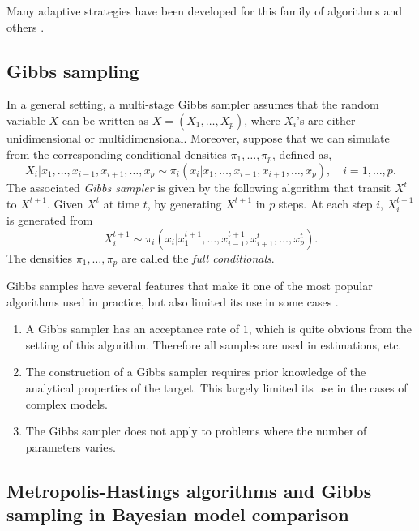 Many adaptive strategies have been developed for this family of algorithms and
others \parencite[see][for a recent review]{Andrieu:2008kh}.

\subsection{Gibbs sampling}
\label{sub:Gibbs sampling}

In a general setting, a multi-stage Gibbs sampler assumes that the random
variable $X$ can be written as $X = (X_1,\dots,X_p)$, where $X_i$'s are either
unidimensional or multidimensional. Moreover, suppose that we can simulate
from the corresponding conditional densities $\pi_1,\dots,\pi_p$, defined as,
\begin{equation}
  X_i|x_1,\dots,x_{i-1},x_{i+1},\dots,x_p
  \sim \pi_i(x_i|x_1,\dots,x_{i-1},x_{i+1},\dots,x_p),\quad i = 1,\dots,p.
\end{equation}
The associated \emph{Gibbs sampler} is given by the following algorithm that
transit $X^t$ to $X^{t+1}$. Given $X^t$ at time $t$, by generating $X^{t+1}$
in $p$ steps. At each step $i$, $X_i^{t+1}$ is generated from
\begin{equation}
  X_i^{t+1} \sim
  \pi_i(x_i|x_1^{t+1},\dots,x_{i-1}^{t+1},x_{i+1}^t,\dots,x_p^t).
\end{equation}
The densities $\pi_1,\dots,\pi_p$ are called the \emph{full conditionals}.

Gibbs samples have several features that make it one of the most popular \mcmc
algorithms used in practice, but also limited its use in some cases
\parencite[see][chap.~10]{Robert:2004tn}.
\begin{enumerate}
  \item A Gibbs sampler has an acceptance rate of $1$, which is quite obvious
    from the setting of this algorithm. Therefore all samples are used in
    estimations, etc.
  \item The construction of a Gibbs sampler requires prior knowledge of the
    analytical properties of the target. This largely limited its use in the
    cases of complex models.
  \item The Gibbs sampler does not apply to problems where the number of
    parameters varies.
\end{enumerate}

\subsection{Metropolis-Hastings algorithms and Gibbs sampling in Bayesian
  model comparison}
\label{sub:Metropolis-Hastings algorithms and Gibbs sampling in Bayesian}

